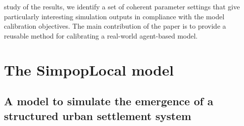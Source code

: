 study of the results, we identify a set of coherent parameter settings that give particularly interesting simulation outputs in compliance with the model calibration objectives. The main contribution of the paper is to provide a reusable method for calibrating a real-world agent-based model.

\section{The SimpopLocal model}
\label{sec:simpoplocal}

\subsection{A model to simulate the emergence of a structured urban settlement system}
\label{subsec:simulate_structure}

